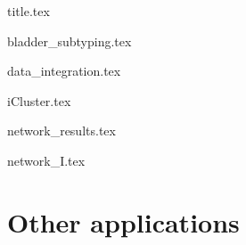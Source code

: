 \documentclass[a4paper, 12pt]{article}
\begin{document}
{title.tex}



\setcounter{tocdepth}{1} %
\setcounter{tocdepth}{2} %
\setcounter{tocdepth}{3} %
\setcounter{tocdepth}{4} %

\tableofcontents

\newpage

\listoffigures

\listoftables


\newpage

\printglossary[type=acronym] 


\newpage

{bladder_subtyping.tex}

\break

{data_integration.tex}

\newpage

{iCluster.tex}

\newpage



{network_results.tex}

{network_I.tex}


\newpage

\section{Other applications}

\newpage



 

    
\end{document}
